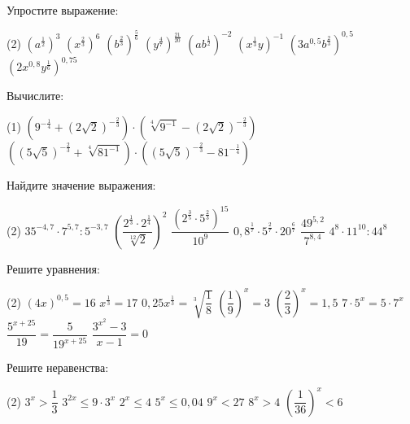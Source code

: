 \begin{class}[number=4]
	\begin{listofex}
		\item Упростите выражение:
		\begin{tasks}(2)
			\task \( (a^{\tfrac{1}{2}})^3 \)
			\task \( (x^{\tfrac{2}{3}})^6 \)
			\task \( (b^{\tfrac{2}{3}})^{\tfrac{5}{6}} \)
			\task \( (y^{\tfrac{4}{7}})^{\tfrac{21}{20}} \)
			\task \( (ab^{\tfrac{1}{2}})^{-2} \)
			\task \( (x^{\tfrac{1}{3}}y)^{-1} \)
			\task \( (3a^{0,5}b^{\tfrac{2}{3}})^{0,5} \)
			\task \( (2x^{0,8}y^{\tfrac{1}{6}})^{0,75} \)
		\end{tasks}
		\item Вычислите:
		\begin{tasks}(1)
			\task \( ( 9^{-\tfrac{1}{4}}+(2\sqrt{2})^{-\tfrac{2}{3}} ) \cdot ( \sqrt[4]{9^{-1}} - (2\sqrt{2})^{-\tfrac{2}{3}} ) \)
			\task \( ( (5\sqrt{5})^{-\tfrac{2}{3}} + \sqrt[4]{81^{-1}} ) \cdot ( (5\sqrt{5})^{-\tfrac{2}{3}} - 81^{-\tfrac{1}{4}} ) \)
		\end{tasks}
		\item Найдите значение выражения:
		\begin{tasks}(2)
			\task \( 35^{-4,7} \cdot 7^{5,7} : 5^{-3,7} \)
			\task \( \left( \dfrac{2^{\tfrac{1}{3}}\cdot2^{\tfrac{1}{4}}}{\sqrt[12]{2}} \right)^2 \)
			\task \( \dfrac{(2^\tfrac{3}{5}\cdot5^{\tfrac{2}{3}})^{15}}{10^9} \)
			\task \( 0,8^{\tfrac{1}{7}}\cdot5^{\tfrac{2}{7}}\cdot20^{\tfrac{6}{7}} \)
			\task \( \dfrac{49^{5,2}}{7^{8,4}} \)
			\task \( 4^8\cdot11^{10}:44^8 \)
		\end{tasks}
		\item Решите уравнения:
		\begin{tasks}(2)
			\task \( (4x)^{0,5} = 16 \)
			\task \( x^{\tfrac{1}{3}} = 17 \)
			\task \( 0,25x^{\tfrac{1}{3}} = \sqrt[3]{\dfrac{1}{8}} \)
			\task \( \left( \dfrac{1}{9} \right)^x=3 \)
			\task \( \left( \dfrac{2}{3} \right)^x=1,5 \)
			\task \( 7 \cdot 5^x = 5 \cdot 7^x \)
			\task \( \dfrac{5^{x+25}}{19}=\dfrac{5}{19^{x+25}} \)
			\task \( \dfrac{3^{x^2}-3}{x-1}=0 \)
		\end{tasks}
		\item Решите неравенства:
		\begin{tasks}(2)
			\task \( 3^x > \dfrac{1}{3} \)
			\task \( 3^{2x} \le 9 \cdot 3^x \)
			\task \( 2^x \le 4 \)
			\task \( 5^x \le 0,04 \)
			\task \( 9^x < 27 \)
			\task \( 8^x>4 \)
			\task \( \left( \dfrac{1}{36} \right)^x < 6 \)
		\end{tasks}

\end{listofex}
\end{class}
